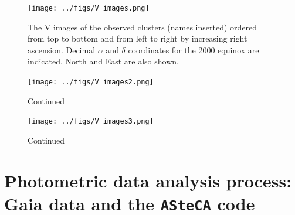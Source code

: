 \documentclass[draft]{aa}
\begin{document}
\begin{figure}[ht]
    \centering
     \texttt{[image: ../figs/V\_images.png]}   
     \caption{The V images of the observed clusters (names inserted) ordered
     from top to bottom and from left to right by increasing right ascension.
     Decimal $\alpha$ and $\delta$ coordinates for the 2000 equinox are
     indicated. North and East are also shown.}
    \label{fig2}
\end{figure}

\begin{figure}[ht]
    \addtocounter{figure}{-1}
    \centering
    \texttt{[image: ../figs/V\_images2.png]}
    \caption{Continued}
    \label{fig2a}
\end{figure}

\begin{figure}[ht]
    \addtocounter{figure}{-1}
    \centering
    \texttt{[image: ../figs/V\_images3.png]}
    \caption{Continued}
    \label{fig2b}
\end{figure}








\section{Photometric data analysis process: Gaia data and the \texttt{ASteCA}
code}
\label{sec:photom_analysis}
\end{document}
